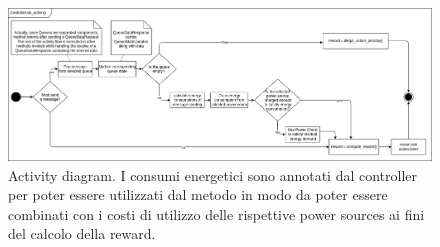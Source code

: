\documentclass[conference]{IEEEtran}
\begin{document}
\begin{figure}
    \centering
    \includegraphics[width=\textwidth]{figs/controller_doAction_activity_diagram.drawio.png}
    \caption{ Activity diagram. I consumi energetici sono annotati dal controller per poter essere utilizzati dal metodo  in modo da poter essere combinati con i costi di utilizzo delle rispettive power sources ai fini del calcolo della reward.}
    \label{fig:controller_doAction_activity_diagram}
\end{figure}
\end{document}
